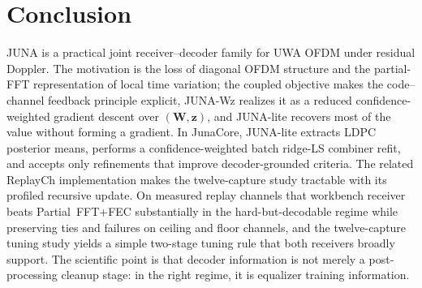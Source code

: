 \documentclass[journal]{IEEEtran}
\newcommand{\juna}{JUNA}
\newcommand{\junalite}{JUNA-lite}
\newcommand{\junawz}{JUNA-Wz}
\begin{document}
\section{Conclusion}\label{sec:conclusion}
\juna{} is a practical joint receiver--decoder family for UWA OFDM under
residual Doppler. The motivation is the loss of diagonal OFDM structure and the
partial-FFT representation of local time variation; the coupled objective makes
the code--channel feedback principle explicit, \junawz{} realizes it as a
reduced confidence-weighted gradient descent over $(\mathbf W,\mathbf z)$, and
\junalite{} recovers most of the value without forming a gradient. In JunaCore,
\junalite{} extracts LDPC posterior means, performs a confidence-weighted batch
ridge-LS combiner refit, and accepts only refinements that improve
decoder-grounded criteria. The related ReplayCh implementation makes the
twelve-capture study tractable with its profiled recursive update. On measured
replay channels that workbench receiver beats Partial~FFT+FEC substantially in the
hard-but-decodable regime while preserving ties and failures on ceiling and floor
channels, and the twelve-capture tuning study yields a simple two-stage tuning
rule that both receivers broadly support. The scientific point is that decoder
information is not merely a post-processing cleanup stage: in the right regime,
it is equalizer training information.



\end{document}

